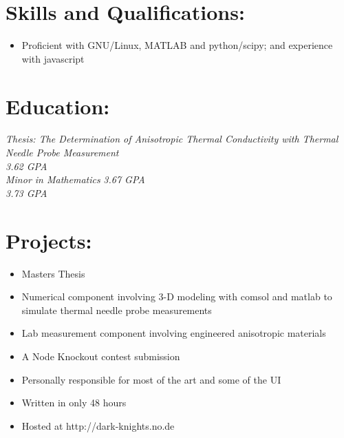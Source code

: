 \documentclass{resume}
\author{ Joshua Holbrook }
\begin{document}
\maketitle

\section{Skills and Qualifications:}
\small
\begin{itemize}
    \item Proficient with GNU/Linux, MATLAB and python/scipy; and experience with javascript

\end{itemize}
\normalsize

\section{Education:}
        \textit{Thesis: The Determination of Anisotropic Thermal Conductivity with Thermal Needle Probe Measurement}\\
        \emph{ 3.62 GPA}\\
        
        \textit{Minor in Mathematics}
        \emph{ 3.67 GPA}\\
        
        \emph{ 3.73 GPA}\\

\section{Projects:}
    \small
    \begin{itemize}
        \item Masters Thesis
        \item Numerical component involving 3-D modeling with comsol and matlab to simulate thermal needle probe measurements
        \item Lab measurement component involving engineered anisotropic materials
    \end{itemize}
    \normalsize

    \small
    \begin{itemize}
        \item A Node Knockout contest submission
        \item Personally responsible for most of the art and some of the UI
        \item Written in only 48 hours
        \item Hosted at http://dark-knights.no.de
    \end{itemize}
    \normalsize
        
\end{document}
